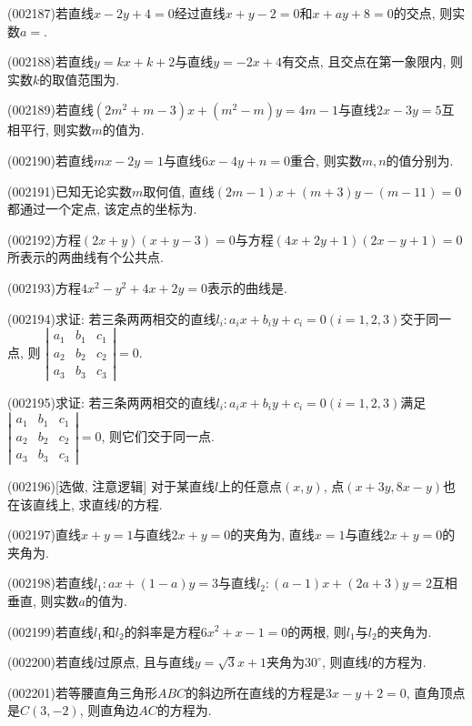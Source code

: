 \item (002187)若直线$x-2y+4=0$经过直线$x+y-2=0$和$x+ay+8=0$的交点, 则实数$a=$.
\item (002188)若直线$y=kx+k+2$与直线$y=-2x+4$有交点, 且交点在第一象限内, 则实数$k$的取值范围为.
\item (002189)若直线$(2m^2+m-3)x+(m^2-m)y=4m-1$与直线$2x-3y=5$互相平行, 则实数$m$的值为.
\item (002190)若直线$mx-2y=1$与直线$6x-4y+n=0$重合, 则实数$m,n$的值分别为.
\item (002191)已知无论实数$m$取何值, 直线$(2m-1)x+(m+3)y-(m-11)=0$都通过一个定点, 该定点的坐标为.
\item (002192)方程$(2x+y)(x+y-3)=0$与方程$(4x+2y+1)(2x-y+1)=0$所表示的两曲线有个公共点.
\item (002193)方程$4x^2-y^2+4x+2y=0$表示的曲线是.
\item (002194)求证: 若三条两两相交的直线$l_i:a_ix+b_iy+c_i=0  (i=1,2,3)$交于同一点, 则
$\left|\begin{array}{ccc}a_1 & b_1& c_1\\a_2& b_2&c_2\\a_3&b_3&c_3\end{array}\right|=0$.
\item (002195)求证: 若三条两两相交的直线$l_i:a_ix+b_iy+c_i=0 (i=1,2,3)$满足$\left|\begin{array}{ccc}a_1 & b_1& c_1\\a_2& b_2&c_2\\a_3&b_3&c_3\end{array}\right|=0$, 则它们交于同一点.
\item (002196)[选做, 注意逻辑]
对于某直线$l$上的任意点$(x,y)$, 点$(x+3y,8x-y)$也在该直线上, 求直线$l$的方程.
\item (002197)直线$x+y=1$与直线$2x+y=0$的夹角为, 直线$x=1$与直线$2x+y=0$的夹角为.
\item (002198)若直线$l_1: ax+(1-a)y=3$与直线$l_2:(a-1)x+(2a+3)y=2$互相垂直, 则实数$a$的值为.
\item (002199)若直线$l_1$和$l_2$的斜率是方程$6x^2+x-1=0$的两根, 则$l_1$与$l_2$的夹角为.
\item (002200)若直线$l$过原点, 且与直线$y=\sqrt{3}x+1$夹角为$30^\circ$, 则直线$l$的方程为.
\item (002201)若等腰直角三角形$ABC$的斜边所在直线的方程是$3x-y+2=0$, 直角顶点是$C(3,-2)$, 则直角边$AC$的方程为.
